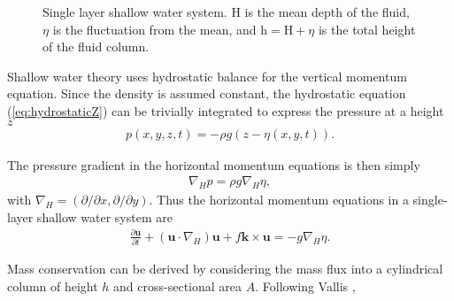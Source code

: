 \begin{figure}[H]
\begin{center}
\caption{Single layer shallow water system. H is the mean depth of the fluid, $\eta$ is the fluctuation from the mean, and $\mathrm{h} = \mathrm{H} + \eta$ is the total height of the fluid column.}
\label{fig:shallowwater}
\end{center}
\end{figure}
Shallow water theory uses hydrostatic balance for the vertical momentum equation. Since the density is assumed constant, the hydrostatic equation (\ref{eq:hydrostaticZ}) can be trivially integrated to express the pressure at a height $z$
\begin{align}
p(x,y,z,t) = -\rho g (z - \eta(x,y,t)).
\end{align}

The pressure gradient in the horizontal momentum equations is then simply
\begin{align}
\nabla_H p = \rho g \nabla_H \eta,
\end{align}
with $\nabla_H = (\partial/\partial x, \partial/\partial y)$. Thus the horizontal momentum equations in a single-layer shallow water system are 
\begin{align}
\frac{\partial \mathbf{u}}{\partial t} + (\mathbf{u} \cdot \nabla_H) \mathbf{u} + f \mathbf{k} \times \mathbf{u} = -g \nabla_H \eta.
\end{align}

Mass conservation can be derived by considering the mass flux into a cylindrical column of height $h$ and cross-sectional area $A$. Following Vallis \cite{Vallis2006},


